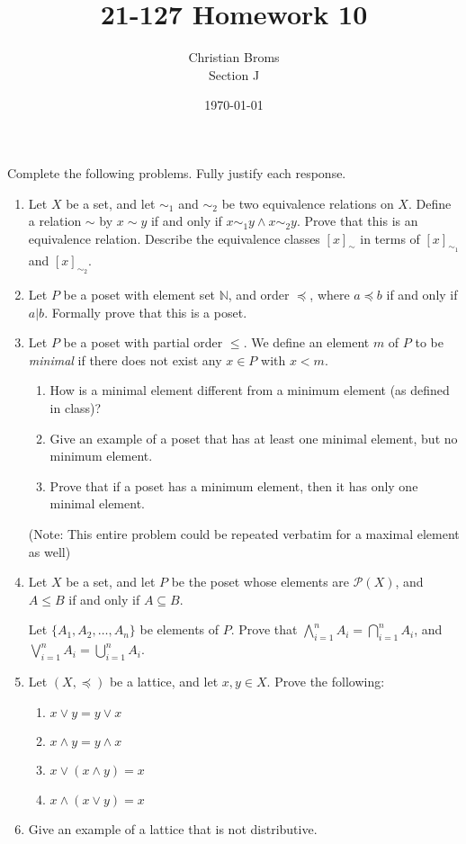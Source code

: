 \documentclass[12pt]{article}
\newcommand{\N}{\mathbb{N}}
\begin{document}
\title{21-127 Homework 10
}
\author{Christian Broms \\ Section J}
\date{\today}
\maketitle
Complete the following problems. Fully justify each response.


\begin{enumerate}

\item Let $X$ be a set, and let $\sim_1$ and $\sim_2$ be two equivalence relations on $X$. Define a relation $\sim$ by $x\sim y$ if and only if $x\sim_1 y \wedge x\sim_2 y$. Prove that this is an equivalence relation. Describe the equivalence classes $[x]_\sim$ in terms of $[x]_{\sim_1}$ and $[x]_{\sim_2}$.

\item Let $P$ be a poset with element set $\N$, and order $\preceq$, where $a\preceq b$ if and only if $a|b$. Formally prove that this is a poset.

\item Let $P$ be a poset with partial order $\leq$. We define an element $m$ of $P$ to be {\it minimal} if there does not exist any $x\in P$ with $x<m$.
\begin{enumerate}
\item How is a minimal element different from a minimum element (as defined in class)?
\item Give an example of a poset that has at least one minimal element, but no minimum element.
\item Prove that if a poset has a minimum element, then it has only one minimal element.
\end{enumerate}
(Note: This entire problem could be repeated verbatim for a maximal element as well)

\item Let $X$ be a set, and let $P$ be the poset whose elements are $\mathcal{P}(X)$, and $A\leq B$ if and only if $A\subseteq B$.

Let $\{A_1, A_2, \dots, A_n\}$ be elements of $P$. Prove that $\displaystyle \bigwedge_{i=1}^n A_i = \displaystyle\bigcap_{i=1}^n A_i$, and $\displaystyle \bigvee_{i=1}^n A_i = \displaystyle\bigcup_{i=1}^n A_i$.

\item Let $(X, \preceq)$ be a lattice, and let $x, y\in X$. Prove the following:
\begin{enumerate}
\item $x\vee y = y \vee x$
\item $x\wedge y = y\wedge x$
\item $x\vee (x\wedge y)=x$
\item $x\wedge(x\vee y)=x$
\end{enumerate}

\item Give an example of a lattice that is not distributive.

\end{enumerate}
\end{document}
